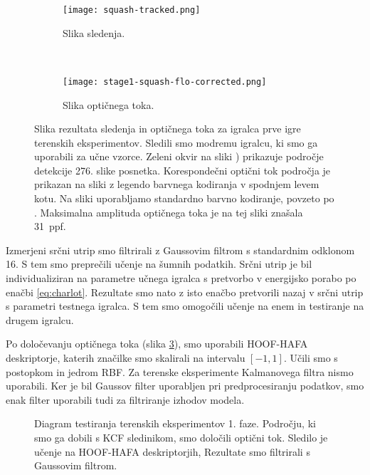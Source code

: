 \begin{figure}[!htb]
	\centering
	\begin{subfigure}[t]{0.45\columnwidth}
		\centering
		\texttt{[image: squash-tracked.png]}
		\caption{Slika sledenja.}
	    \label{fig:sledenje-squash}
	\end{subfigure}
	~
	\begin{subfigure}[t]{0.45\columnwidth}
		\centering
		\texttt{[image: stage1-squash-flo-corrected.png]}
		\caption{Slika optičnega toka.}
		\label{fig:of-squash}
	\end{subfigure}
	\caption[Slika sledenja in optičnega toka za igralca terenskih eksperimentov]{Slika rezultata sledenja in optičnega toka za igralca prve igre terenskih eksperimentov. Sledili smo modremu igralcu, ki smo ga uporabili za učne vzorce. Zeleni okvir na sliki ) prikazuje področje detekcije 276. slike posnetka. Korespondečni optični tok področja je prikazan na sliki  z legendo barvnega kodiranja v spodnjem levem kotu. Na sliki uporabljamo standardno barvno kodiranje, povzeto po \cite{baker2011database}. Maksimalna amplituda optičnega toka je na tej sliki znašala \SI{31}{ppf}. }
	\label{fig:squash}
\end{figure}

Izmerjeni srčni utrip smo filtrirali z Gaussovim filtrom s standardnim odklonom \num{16}. S tem smo preprečili učenje na šumnih podatkih. Srčni utrip je bil individualiziran na parametre učnega igralca s pretvorbo v energijsko porabo po enačbi \eqref{eq:charlot}. Rezultate smo nato z isto enačbo pretvorili nazaj v srčni utrip s parametri testnega igralca. S tem smo omogočili učenje na enem in testiranje na drugem igralcu. 

Po določevanju optičnega toka (slika \ref{fig:squash}), smo uporabili HOOF-HAFA deskriptorje, katerih značilke smo skalirali na intervalu $[-1,1]$. Učili smo s postopkom \esvr in jedrom RBF. Za terenske eksperimente Kalmanovega filtra nismo uporabili. Ker je bil Gaussov filter uporabljen pri predprocesiranju podatkov, smo enak filter uporabili tudi za filtriranje izhodov modela.

\begin{figure}[!htb]
	\centering
	\resizebox{\columnwidth}{!}{}
	\caption[Diagram testiranja terenskih eksperimentov 1. faze]{Diagram testiranja terenskih eksperimentov 1. faze. Področju, ki smo ga dobili s KCF sledinikom, smo določili optični tok. Sledilo je učenje na HOOF-HAFA deskriptorjih, Rezultate smo filtrirali s Gaussovim filtrom.}
	\label{fig:diagram-procesiranja-field-stag1}
\end{figure}

















